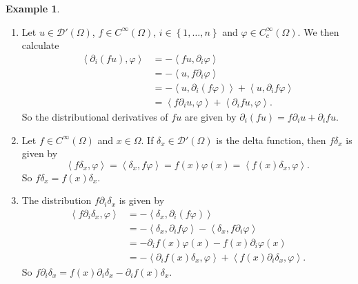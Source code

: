 \documentclass{book}
\newcommand{\scrD}{\mathscr{D}}
\renewcommand{\phi}{\varphi}
\newcommand{\set}[1]{\left\{ {#1} \right\}}
\newcommand{\angles}[1]{\left\langle {#1} \right\rangle}
\theoremstyle{definition}
\newtheorem{example}[theorem]{Example}
\theoremstyle{remark}
\numberwithin{equation}{chapter}
\begin{document}
\begin{example}
    \begin{enumerate}[label=(\arabic*)]
        \item Let $u \in \scrD'(\Omega)$, $f \in C^\infty(\Omega)$, $i \in \set{1,\dots,n}$ and $\phi \in C_c^\infty(\Omega)$. We then calculate
        \begin{equation} \begin{aligned}
            \angles{ \partial_i(fu),\phi } &= - \angles{ fu,\partial_i \phi } \\
                                           &= - \angles{ u,f\partial_i \phi } \\
                                           &= - \angles{ u,\partial_i(f\phi) } + \angles{ u,\partial_i f \phi } \\
                                           &= \angles{ f\partial_i u,\phi } + \angles{ \partial_i f u,\phi }.
        \end{aligned} \end{equation}
        So the distributional derivatives of $fu$ are given by $\partial_i(fu) = f\partial_i u + \partial_i f u$.

        \item Let $f \in C^\infty(\Omega)$ and $x \in \Omega$. If $\delta_x \in \scrD'(\Omega)$ is the delta function, then $f\delta_x$ is given by 
        \begin{equation}
            \angles{ f\delta_x,\phi } = \angles{ \delta_x,f\phi } = f(x)\phi(x) = \angles{ f(x)\delta_x,\phi }.
        \end{equation}
        So $f\delta_x = f(x)\delta_x$.

        \item The distribution $f\partial_i \delta_x$ is given by 
        \begin{equation} \begin{aligned}
            \angles{ f\partial_i \delta_x,\phi } &= - \angles{ \delta_x,\partial_i(f\phi) } \\
                                                 &= - \angles{ \delta_x,\partial_i f \phi } - \angles{ \delta_x, f\partial_i \phi } \\
                                                 &= - \partial_i f(x) \phi(x) - f(x)\partial_i \phi(x) \\
                                                 &= - \angles{ \partial_i f(x) \delta_x,\phi } + \angles{ f(x)\partial_i \delta_x,\phi}.
        \end{aligned} \end{equation}
        So $f \partial_i \delta_x = f(x) \partial_i \delta_x - \partial_i f(x) \delta_x$.
    \end{enumerate}
\end{example}
\end{document}
